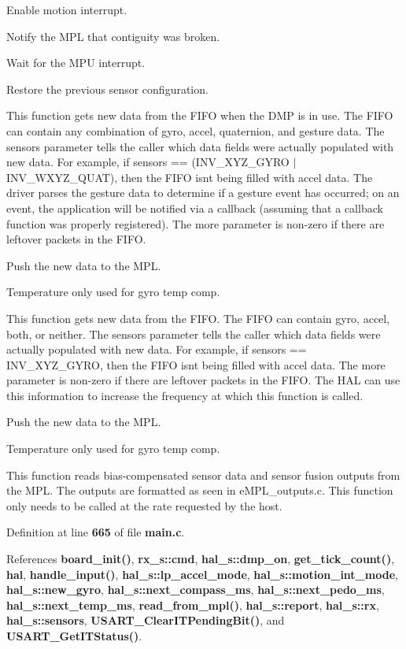 Enable motion interrupt.

Notify the M\+PL that contiguity was broken.

Wait for the M\+PU interrupt.

Restore the previous sensor configuration.

This function gets new data from the F\+I\+FO when the D\+MP is in use. The F\+I\+FO can contain any combination of gyro, accel, quaternion, and gesture data. The sensors parameter tells the caller which data fields were actually populated with new data. For example, if sensors == (I\+N\+V\+\_\+\+X\+Y\+Z\+\_\+\+G\+Y\+RO $\vert$ I\+N\+V\+\_\+\+W\+X\+Y\+Z\+\_\+\+Q\+U\+AT), then the F\+I\+FO isn\textquotesingle{}t being filled with accel data. The driver parses the gesture data to determine if a gesture event has occurred; on an event, the application will be notified via a callback (assuming that a callback function was properly registered). The more parameter is non-\/zero if there are leftover packets in the F\+I\+FO.

Push the new data to the M\+PL.

Temperature only used for gyro temp comp.

This function gets new data from the F\+I\+FO. The F\+I\+FO can contain gyro, accel, both, or neither. The sensors parameter tells the caller which data fields were actually populated with new data. For example, if sensors == I\+N\+V\+\_\+\+X\+Y\+Z\+\_\+\+G\+Y\+RO, then the F\+I\+FO isn\textquotesingle{}t being filled with accel data. The more parameter is non-\/zero if there are leftover packets in the F\+I\+FO. The H\+AL can use this information to increase the frequency at which this function is called.

Push the new data to the M\+PL.

Temperature only used for gyro temp comp.

This function reads bias-\/compensated sensor data and sensor fusion outputs from the M\+PL. The outputs are formatted as seen in e\+M\+P\+L\+\_\+outputs.\+c. This function only needs to be called at the rate requested by the host.

Definition at line \textbf{ 665} of file \textbf{ main.\+c}.



References \textbf{ board\+\_\+init()}, \textbf{ rx\+\_\+s\+::cmd}, \textbf{ hal\+\_\+s\+::dmp\+\_\+on}, \textbf{ get\+\_\+tick\+\_\+count()}, \textbf{ hal}, \textbf{ handle\+\_\+input()}, \textbf{ hal\+\_\+s\+::lp\+\_\+accel\+\_\+mode}, \textbf{ hal\+\_\+s\+::motion\+\_\+int\+\_\+mode}, \textbf{ hal\+\_\+s\+::new\+\_\+gyro}, \textbf{ hal\+\_\+s\+::next\+\_\+compass\+\_\+ms}, \textbf{ hal\+\_\+s\+::next\+\_\+pedo\+\_\+ms}, \textbf{ hal\+\_\+s\+::next\+\_\+temp\+\_\+ms}, \textbf{ read\+\_\+from\+\_\+mpl()}, \textbf{ hal\+\_\+s\+::report}, \textbf{ hal\+\_\+s\+::rx}, \textbf{ hal\+\_\+s\+::sensors}, \textbf{ U\+S\+A\+R\+T\+\_\+\+Clear\+I\+T\+Pending\+Bit()}, and \textbf{ U\+S\+A\+R\+T\+\_\+\+Get\+I\+T\+Status()}.


